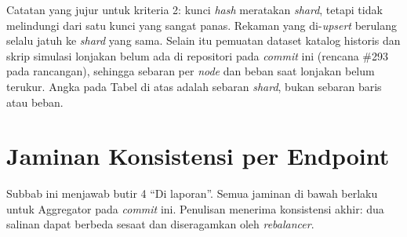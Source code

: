 Catatan yang jujur untuk kriteria 2: kunci \textit{hash} meratakan \textit{shard}, tetapi tidak melindungi dari satu kunci yang sangat panas. Rekaman yang di-\textit{upsert} berulang selalu jatuh ke \textit{shard} yang sama. Selain itu pemuatan dataset katalog historis dan skrip simulasi lonjakan belum ada di repositori pada \textit{commit} ini (rencana \#293 pada rancangan), sehingga sebaran per \textit{node} dan beban saat lonjakan belum terukur. Angka pada Tabel di atas adalah sebaran \textit{shard}, bukan sebaran baris atau beban.

\section{Jaminan Konsistensi per Endpoint}

Subbab ini menjawab butir 4 ``Di laporan''. Semua jaminan di bawah berlaku untuk Aggregator pada \textit{commit} ini. Penulisan menerima konsistensi akhir: dua salinan dapat berbeda sesaat dan diseragamkan oleh \textit{rebalancer}.

